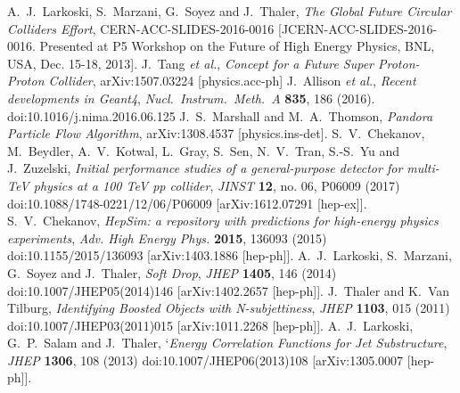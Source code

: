 \documentclass[a4paper]{PoS}
\begin{document}
\begin{thebibliography}{99}
  A.~J.~Larkoski, S.~Marzani, G.~Soyez and J.~Thaler,
  \emph{The Global Future Circular Colliders Effort},
  CERN-ACC-SLIDES-2016-0016
  [JCERN-ACC-SLIDES-2016-0016. Presented at P5 Workshop on the Future of High Energy Physics, BNL, USA, Dec. 15-18,  2013].
  J.~Tang {\it et al.},
  \emph{Concept for a Future Super Proton-Proton Collider},
  arXiv:1507.03224 [physics.acc-ph]
  J.~Allison {\it et al.},
  \emph{Recent developments in Geant4},
  \emph{Nucl.\ Instrum.\ Meth.\ A} {\bf 835}, 186 (2016).
  doi:10.1016/j.nima.2016.06.125
  J.~S.~Marshall and M.~A.~Thomson,
  \emph{Pandora Particle Flow Algorithm},
  arXiv:1308.4537 [physics.ins-det].
  S.~V.~Chekanov, M.~Beydler, A.~V.~Kotwal, L.~Gray, S.~Sen, N.~V.~Tran, S.-S.~Yu and J.~Zuzelski,
  \emph{Initial performance studies of a general-purpose detector for multi-TeV physics at a 100 TeV pp collider},
  \emph{JINST} {\bf 12}, no. 06, P06009 (2017)
  doi:10.1088/1748-0221/12/06/P06009
  [arXiv:1612.07291 [hep-ex]].
  S.~V.~Chekanov,
  \emph{HepSim: a repository with predictions for high-energy physics experiments},
  \emph{Adv. High Energy Phys.}  {\bf 2015}, 136093 (2015)
  doi:10.1155/2015/136093
  [arXiv:1403.1886 [hep-ph]].
  A.~J.~Larkoski, S.~Marzani, G.~Soyez and J.~Thaler,
  \emph{Soft Drop},
  \emph{JHEP} {\bf 1405}, 146 (2014)
  doi:10.1007/JHEP05(2014)146
  [arXiv:1402.2657 [hep-ph]].
  J.~Thaler and K.~Van Tilburg,
  \emph{Identifying Boosted Objects with N-subjettiness},
  \emph{JHEP} {\bf 1103}, 015 (2011)
  doi:10.1007/JHEP03(2011)015
  [arXiv:1011.2268 [hep-ph]].
  A.~J.~Larkoski, G.~P.~Salam and J.~Thaler,
  `\emph{Energy Correlation Functions for Jet Substructure},
  \emph{JHEP} {\bf 1306}, 108 (2013)
  doi:10.1007/JHEP06(2013)108
  [arXiv:1305.0007 [hep-ph]].
\end{thebibliography}
\end{document}
